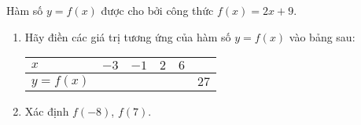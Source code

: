 \begin{bt}%
Hàm số $y=f(x)$ được cho bởi công thức $f(x)=2x+9$.
\begin{enumerate}
\item Hãy điền các giá trị tương ứng của hàm số $y=f(x)$ vào bảng sau:
\begin{center}
\begin{tabular}{|>{\centering\arraybackslash}p{2.5cm}|>{\centering\arraybackslash}p{1cm}|>{\centering\arraybackslash}p{1cm}|>{\centering\arraybackslash}p{1cm}|>{\centering\arraybackslash}p{1cm}|>{\centering\arraybackslash}p{1cm}|}
\hline 
$x$ & $-3$ & $-1$ & $2$ & $6$ &  \\ 
\hline 
$y=f(x)$ &  &  &  &  & $27$ \\ 
\hline 
\end{tabular} 
\end{center}
\item Xác định $f(-8)$, $f(7)$.
\end{enumerate}
\end{bt}
